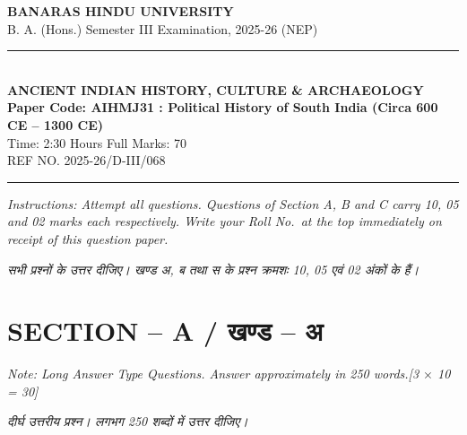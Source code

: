 \documentclass[11pt,a4paper]{article}
\newcommand{\pts}[1]{\hfill \textit{[#1]}}
\begin{document}
\begin{center}
  {\large\bfseries BANARAS HINDU UNIVERSITY}\\[2pt]
  {\normalsize B. A. (Hons.) Semester III Examination, 2025-26 (NEP)}\\[6pt]
  \rule{0.8\linewidth}{0.5pt}\\[6pt]
  {\large\bfseries ANCIENT INDIAN HISTORY, CULTURE \& ARCHAEOLOGY}\\[4pt]
  {\large\bfseries Paper Code: AIHMJ31 : Political History of South India (Circa 600 CE -- 1300 CE)}\\[4pt]
  {\normalsize Time: 2:30 Hours \hfill Full Marks: 70}\\[2pt]
  {\small REF NO. 2025-26/D-III/068}
\end{center}
\rule{\linewidth}{0.4pt}
\smallskip

\noindent \textit{Instructions: Attempt all questions. Questions of Section A, B and C carry 10, 05 and 02 marks each respectively. Write your Roll No.\ at the top immediately on receipt of this question paper.}

\smallskip
\noindent \textit{सभी प्रश्नों के उत्तर दीजिए। खण्ड अ, ब तथा स के प्रश्न क्रमशः 10, 05 एवं 02 अंकों के हैं।}

\bigskip

\section*{SECTION -- A / खण्ड -- अ}
\noindent \textit{Note: Long Answer Type Questions. Answer approximately in 250 words.}\pts{3 $\times$ 10 = 30}

\noindent \textit{दीर्घ उत्तरीय प्रश्न। लगभग 250 शब्दों में उत्तर दीजिए।}
\end{document}
